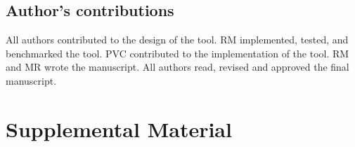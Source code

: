 \subsection{Author’s contributions} \label{ssec:declarations_ssec6}

All authors contributed to the design of the tool. RM implemented, tested, and benchmarked the tool. PVC contributed to the implementation of the tool. RM and MR wrote the manuscript. All authors read, revised and approved the final manuscript.




% 





\section{Supplemental Material}



\newpage





